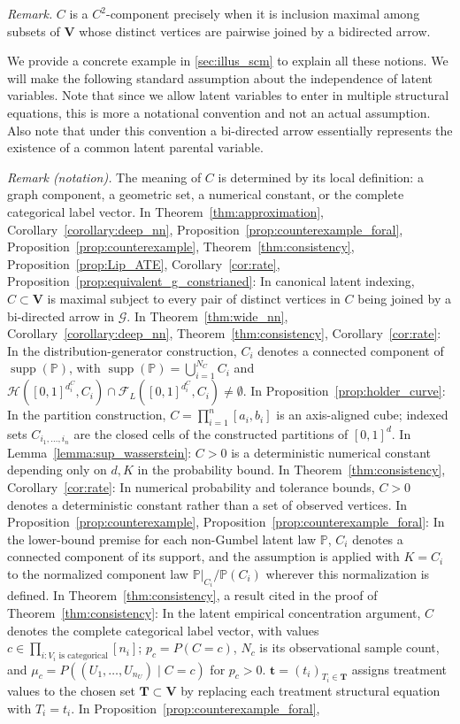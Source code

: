 \documentclass[12pt]{article}
\theoremstyle{plain}
\theoremstyle{definition}
\theoremstyle{remark}
\begin{document}
\noindent\textit{Remark.} $C$ is a $C^2$-component precisely when it is inclusion maximal among subsets of $\boldsymbol V$ whose distinct vertices are pairwise joined by a bidirected arrow.

We provide a concrete example in \cref{sec:illus_scm} to explain all these notions. We will make the following standard assumption about the independence of latent variables. Note that since we allow latent variables to enter in multiple structural equations, this is more a notational convention and not an actual assumption. Also note that under this convention a bi-directed arrow essentially represents the existence of a common latent parental variable.

\noindent\textit{Remark (notation).} The meaning of $C$ is determined by its local definition: a graph component, a geometric set, a numerical constant, or the complete categorical label vector. In Theorem~\ref{thm:approximation}, Corollary~\ref{corollary:deep_nn}, Proposition~\ref{prop:counterexample_foral}, Proposition~\ref{prop:counterexample}, Theorem~\ref{thm:consistency}, Proposition~\ref{prop:Lip_ATE}, Corollary~\ref{cor:rate}, Proposition~\ref{prop:equivalent_g_constrianed}: In canonical latent indexing, $C\subset\boldsymbol{V}$ is maximal subject to every pair of distinct vertices in $C$ being joined by a bi-directed arrow in $\mathcal{G}$. In Theorem~\ref{thm:wide_nn}, Corollary~\ref{corollary:deep_nn}, Theorem~\ref{thm:consistency}, Corollary~\ref{cor:rate}: In the distribution-generator construction, $C_i$ denotes a connected component of $\operatorname{supp}(\mathbb{P})$, with $\operatorname{supp}(\mathbb{P})=\bigcup_{i=1}^{N_C}C_i$ and $\mathcal{H}([0,1]^{d_i^C},C_i)\cap\mathcal{F}_L([0,1]^{d_i^C},C_i)\neq\emptyset$. In Proposition~\ref{prop:holder_curve}: In the partition construction, $C=\prod_{i=1}^{n}[a_i,b_i]$ is an axis-aligned cube; indexed sets $C_{i_1,\ldots,i_n}$ are the closed cells of the constructed partitions of $[0,1]^d$. In Lemma~\ref{lemma:sup_wasserstein}: $C>0$ is a deterministic numerical constant depending only on $d,K$ in the probability bound. In Theorem~\ref{thm:consistency}, Corollary~\ref{cor:rate}: In numerical probability and tolerance bounds, $C>0$ denotes a deterministic constant rather than a set of observed vertices. In Proposition~\ref{prop:counterexample}, Proposition~\ref{prop:counterexample_foral}: In the lower-bound premise for each non-Gumbel latent law $\mathbb P$, $C_i$ denotes a connected component of its support, and the assumption is applied with $K=C_i$ to the normalized component law $\mathbb P|_{C_i}/\mathbb P(C_i)$ wherever this normalization is defined. In Theorem~\ref{thm:consistency}, a result cited in the proof of Theorem~\ref{thm:consistency}: In the latent empirical concentration argument, $C$ denotes the complete categorical label vector, with values $c\in\prod_{i:V_i\text{ is categorical}}[n_i]$; $p_c=P(C=c)$, $N_c$ is its observational sample count, and $\mu_c=P((U_1,\ldots,U_{n_U})\mid C=c)$ for $p_c>0$. $\boldsymbol{t}=(t_i)_{T_i\in\boldsymbol{T}}$ assigns treatment values to the chosen set $\boldsymbol{T}\subset\boldsymbol{V}$ by replacing each treatment structural equation with $T_i=t_i$. In Proposition~\ref{prop:counterexample_foral}, 
\end{document}
